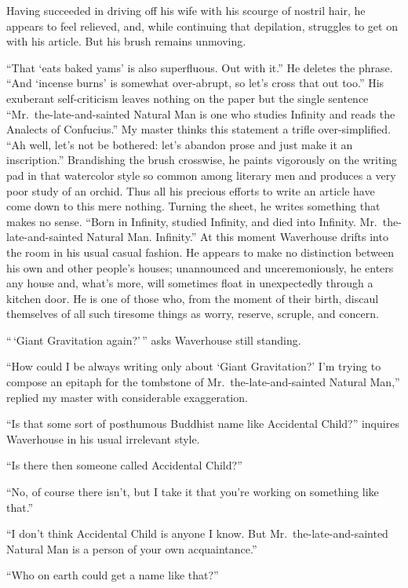 \documentclass{book}
\begin{document}
Having succeeded in driving off his wife with his scourge of nostril
hair, he appears to feel relieved, and, while continuing that
depilation, struggles to get on with his article. But his brush remains
unmoving.

``That `eats baked yams' is also superfluous. Out with it.'' He deletes
the phrase. ``And `incense burns' is somewhat over-abrupt, so let's
cross that out too.'' His exuberant self-criticism leaves nothing on the
paper but the single sentence ``Mr.~the-late-and-sainted Natural Man is
one who studies Infinity and reads the Analects of Confucius.'' My
master thinks this statement a trifle over-simplified. ``Ah well, let's
not be bothered: let's abandon prose and just make it an inscription.''
Brandishing the brush crosswise, he paints vigorously on the writing pad
in that watercolor style so common among literary men and produces a
very poor study of an orchid. Thus all his precious efforts to write an
article have come down to this mere nothing. Turning the sheet, he
writes something that makes no sense. ``Born in Infinity, studied
Infinity, and died into Infinity. Mr.~the-late-and-sainted Natural Man.
Infinity.'' At this moment Waverhouse drifts into the room in his usual
casual fashion. He appears to make no distinction between his own and
other people's houses; unannounced and unceremoniously, he enters any
house and, what's more, will sometimes float in unexpectedly through a
kitchen door. He is one of those who, from the moment of their birth,
discaul themselves of all such tiresome things as worry, reserve,
scruple, and concern.

``\,`Giant Gravitation again?'\,'' asks Waverhouse still standing.

``How could I be always writing only about `Giant Gravitation?' I'm
trying to compose an epitaph for the tombstone of
Mr.~the-late-and-sainted Natural Man,'' replied my master with
considerable exaggeration.

``Is that some sort of posthumous Buddhist name like Accidental Child?''
inquires Waverhouse in his usual irrelevant style.

``Is there then someone called Accidental Child?''

``No, of course there isn't, but I take it that you're working on
something like that.''

``I don't think Accidental Child is anyone I know. But
Mr.~the-late-and-sainted Natural Man is a person of your own
acquaintance.''

``Who on earth could get a name like that?''
\end{document}
